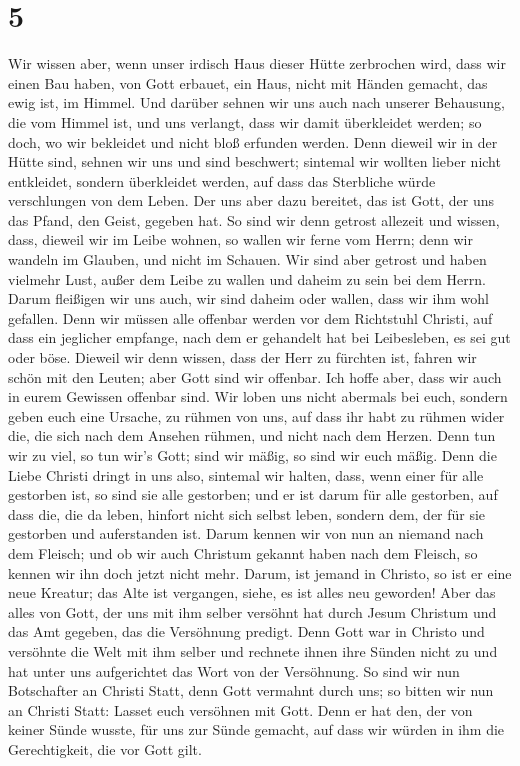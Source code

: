 \hypertarget{section-4}{%
\section{5}\label{section-4}}

 Wir wissen aber, wenn unser irdisch Haus dieser Hütte
zerbrochen wird, dass wir einen Bau haben, von Gott erbauet, ein Haus,
nicht mit Händen gemacht, das ewig ist, im Himmel.  Und
darüber sehnen wir uns auch nach unserer Behausung, die vom Himmel ist,
und uns verlangt, dass wir damit überkleidet werden;  so
doch, wo wir bekleidet und nicht bloß erfunden werden. 
Denn dieweil wir in der Hütte sind, sehnen wir uns und sind beschwert;
sintemal wir wollten lieber nicht entkleidet, sondern überkleidet
werden, auf dass das Sterbliche würde verschlungen von dem Leben.
 Der uns aber dazu bereitet, das ist Gott, der uns das
Pfand, den Geist, gegeben hat.  So sind wir denn getrost
allezeit und wissen, dass, dieweil wir im Leibe wohnen, so wallen wir
ferne vom Herrn;  denn wir wandeln im Glauben, und nicht
im Schauen.  Wir sind aber getrost und haben vielmehr
Lust, außer dem Leibe zu wallen und daheim zu sein bei dem Herrn.
 Darum fleißigen wir uns auch, wir sind daheim oder
wallen, dass wir ihm wohl gefallen.  Denn wir müssen alle
offenbar werden vor dem Richtstuhl Christi, auf dass ein jeglicher
empfange, nach dem er gehandelt hat bei Leibesleben, es sei gut oder
böse.  Dieweil wir denn wissen, dass der Herr zu fürchten
ist, fahren wir schön mit den Leuten; aber Gott sind wir offenbar. Ich
hoffe aber, dass wir auch in eurem Gewissen offenbar sind.
 Wir loben uns nicht abermals bei euch, sondern geben
euch eine Ursache, zu rühmen von uns, auf dass ihr habt zu rühmen wider
die, die sich nach dem Ansehen rühmen, und nicht nach dem Herzen.
 Denn tun wir zu viel, so tun wir's Gott; sind wir mäßig,
so sind wir euch mäßig.  Denn die Liebe Christi dringt in
uns also, sintemal wir halten, dass, wenn einer für alle gestorben ist,
so sind sie alle gestorben;  und er ist darum für alle
gestorben, auf dass die, die da leben, hinfort nicht sich selbst leben,
sondern dem, der für sie gestorben und auferstanden ist. 
Darum kennen wir von nun an niemand nach dem Fleisch; und ob wir auch
Christum gekannt haben nach dem Fleisch, so kennen wir ihn doch jetzt
nicht mehr.  Darum, ist jemand in Christo, so ist er eine
neue Kreatur; das Alte ist vergangen, siehe, es ist alles neu geworden!
 Aber das alles von Gott, der uns mit ihm selber versöhnt
hat durch Jesum Christum und das Amt gegeben, das die Versöhnung
predigt.  Denn Gott war in Christo und versöhnte die Welt
mit ihm selber und rechnete ihnen ihre Sünden nicht zu und hat unter uns
aufgerichtet das Wort von der Versöhnung.  So sind wir
nun Botschafter an Christi Statt, denn Gott vermahnt durch uns; so
bitten wir nun an Christi Statt: Lasset euch versöhnen mit Gott.
 Denn er hat den, der von keiner Sünde wusste, für uns
zur Sünde gemacht, auf dass wir würden in ihm die Gerechtigkeit, die vor
Gott gilt.

